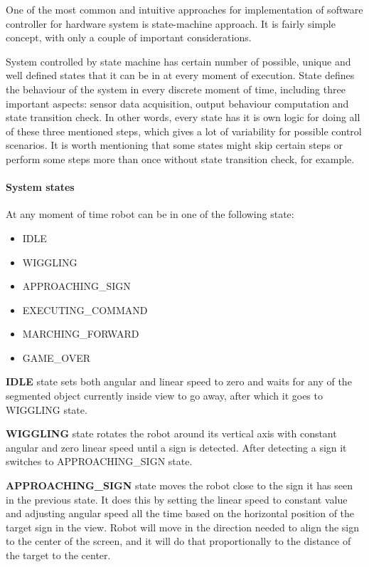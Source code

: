 
One of the most common and intuitive approaches for implementation of software controller for hardware system is state-machine approach. It is fairly simple concept, with only a couple of important considerations.

System controlled by state machine has certain number of possible, unique and well defined states that it can be in at every moment of execution. State defines the behaviour of the system in every discrete moment of time, including three important aspects: sensor data acquisition, output behaviour computation and state transition check. In other words, every state has it is own logic for doing all of these three mentioned steps, which gives a lot of variability for possible control scenarios. It is worth mentioning that some states might skip certain steps or perform some steps more than once without state transition check, for example.

\paragraph{System states}

At any moment of time robot can be in one of the following state:

\begin{itemize}
	\item IDLE
	\item WIGGLING
	\item APPROACHING\_SIGN
	\item EXECUTING\_COMMAND
	\item MARCHING\_FORWARD
	\item GAME\_OVER 
\end{itemize}

\textbf{IDLE} state sets both angular and linear speed to zero and waits for any of the segmented object currently inside view to go away, after which it goes to WIGGLING state.

\textbf{WIGGLING} state rotates the robot around its vertical axis with constant angular and zero linear speed until a sign is detected. After detecting a sign it switches to APPROACHING\_SIGN state.

\textbf{APPROACHING\_SIGN} state moves the robot close to the sign it has seen in the previous state. It does this by setting the linear speed to constant value and adjusting angular speed all the time based on the horizontal position of the target sign in the view. Robot will move in the direction needed to align the sign to the center of the screen, and it will do that proportionally to the distance of the target to the center.

